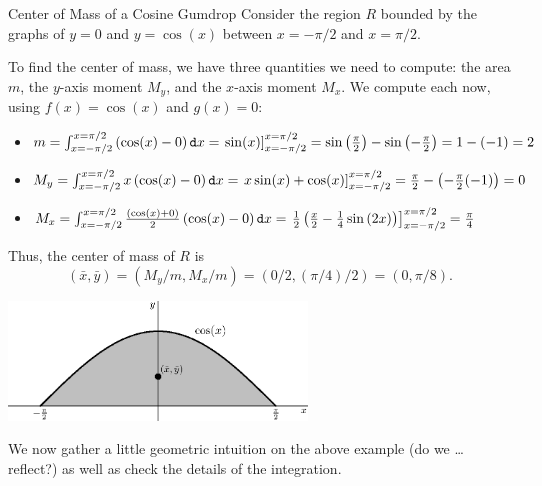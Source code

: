 \begin{example}{Center of Mass of a Cosine Gumdrop}\label{gumdrop}
Consider the region $R$ bounded by the graphs of $y=0$ and $y=\cos(x)$ between $x=-\pi/2$ and $x=\pi/2$.

To find the center of mass, we have three quantities we need to compute: the area $m$, the $y$-axis moment $M_y$, and the $x$-axis moment $M_x$.  We compute each now, using $f(x)=\cos(x)$ and $g(x)=0$:

\begin{itemize}
\item $m=\int_{x=-\pi/2}^{ x=\pi/2}\left(\cos(x)-0\right)\mathop{}\!\mathtt{d} x = \left.\sin(x) \right]_{x=-\pi/2}^{x=\pi/2}=\sin\left(\frac{\pi}{2}\right)-\sin\left(-\frac{\pi}{2}\right)=1-(-1)=2$
\item $M_y=\int_{x=-\pi/2}^{x=\pi/2}x\left(\cos(x)-0\right)\mathop{}\!\mathtt{d} x =\left.x\sin(x)+\cos(x)\right]_{x=-\pi/2}^{x=\pi/2} = \frac{\pi}{2}-\left(-\frac{\pi}{2}(-1)\right)=0 $
\item $M_x=\int_{x=-\pi/2}^{x=\pi/2}\frac{\left(\cos(x)+0\right)}{2}\left(\cos(x)-0\right)\mathop{}\!\mathtt{d} x =\left.\frac{1}{2}\left(\frac{x}{2}-\frac{1}{4}\sin\left(2x\right)\right)\right]_{x=-\pi/2}^{x=\pi/2}=\frac{\pi}{4} $ 
\end{itemize}
Thus, the center of mass of $R$ is $$\left(\bar{x},\bar{y}\right)=\left(M_y/m,M_x/m\right)=\left(0/2,\left(\pi/4\right)/2\right)=\left(0,\pi/8\right). $$ 
\begin{center}
\includegraphics[width=300px]{ChapterGeom/Figures/CosineGumdrop}
\end{center}
\end{example}

We now gather a little geometric intuition on the above example (do we \ldots reflect?) as well as check the details of the integration.

